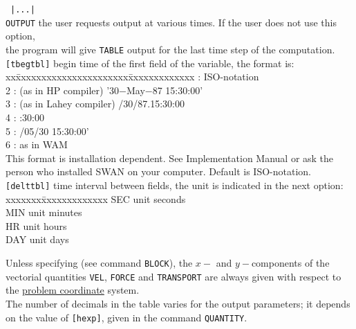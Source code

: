 \documentclass[12pt]{book}
\begin{document}
\begin{tabbing}
\, {\tt  |...|}    \> \\
{\tt OUTPUT}    \> the user requests output at various times. If the user does not use this option,\+\\
                   the program will give {\tt TABLE} output for the last time step of the computation.\-\\
{\tt [tbegtbl]} \> begin time of the first field of the variable, the format is:\+\\
                   \pushtabs
                   xx\=xxxxxxxxxxxxxxxxxxxxxx\=xxxxxxxxxxxxx  \>: ISO-notation                     \\
                   2 \>: (as in HP compiler)    \> '30$-$May$-$87 15:30:00' \\
                   3 \>: (as in Lahey compiler) /30/87.15:30:00        \\
                   4 \>:                        :30:00                 \\
                   5 \>:                        /05/30 15:30:00'       \\
                   6 \>: as in WAM                             \\
                   \poptabs
                   This format is installation dependent. See Implementation Manual or ask the\\
                   person who installed SWAN on your computer. Default is ISO-notation.\-\\
{\tt [delttbl]} \> time interval between fields, the unit is indicated in the next option:\+\\
                   \pushtabs
                   xxxxxxx\=xxxxxxxxxxxxx \kill
                   SEC \> unit seconds\\
                   MIN \> unit minutes\\
                   HR  \> unit hours\\
                   DAY \> unit days\-\\
                   \poptabs
\end{tabbing}

\noindent
Unless specifying (see command {\tt BLOCK}), the $x-$ and $y-$components of the vectorial quantities {\tt VEL},
{\tt FORCE} and {\tt TRANSPORT} are always given with respect to the \underline{problem coordinate} system.
\\[2ex]
The number of decimals in the table varies for the output parameters; it depends on the value of {\tt [hexp]}, given
in the command {\tt QUANTITY}.
\end{document}

